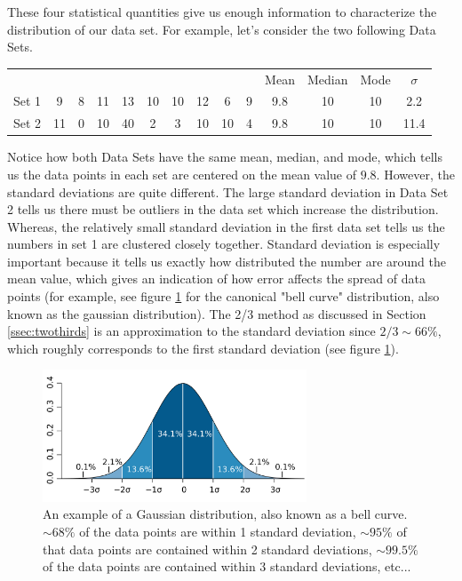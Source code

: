 \documentclass[letterpaper, 12pt]{book}
\newcommand{\myskip}{\vspace{0.5\baselineskip}}
\begin{document}
These four statistical quantities give us enough information to characterize the distribution of our data set. For example, let's consider the two following Data Sets.
\myskip
\begin{center}
\begin{tabular}{c | c | c | c | c | c | c | c | c | c | c | c | c | c  }
&&&&&&&&&&Mean&Median&Mode& $\sigma$ \\
Set 1 & 9&8&11&13&10&10&12&6&9 &9.8&10&10&2.2\\
Set 2 & 11&0&10&40&2&3&10&10&4 &9.8&10&10&11.4
\end{tabular}
\end{center}
\myskip
Notice how both Data Sets have the same mean, median, and mode, which tells us the data points in each set are centered on the mean value of $9.8$. However, the standard deviations are quite different. The large standard deviation in Data Set 2 tells us there must be outliers in the data set which increase the distribution. Whereas, the relatively small standard deviation in the first data set tells us the numbers in set 1 are clustered closely together. Standard deviation is especially important because  it tells us exactly how distributed the number are around the mean value, which gives an indication of how error affects the spread of data points (for example, see figure \ref{fig:bellcurve} for the canonical "bell curve" distribution, also known as the gaussian distribution). The 2/3 method as discussed in Section \ref{ssec:twothirds} is an approximation to the standard deviation since $2/3 \sim 66\%$, which roughly corresponds to the first standard deviation (see figure \ref{fig:bellcurve}).

\begin{figure}[h]
    \begin{center}
        \includegraphics[width=0.7\textwidth]{./pic/image3.png}
    \end{center}
    \caption{An example of a Gaussian distribution, also known as a bell curve. $\sim 68\%$ of the data points are within 1 standard deviation, $\sim 95\%$ of that data points are contained within 2 standard deviations, $\sim 99.5 \%$ of the data points are contained within 3 standard deviations, etc...}
    \label{fig:bellcurve}
\end{figure}
\end{document}
